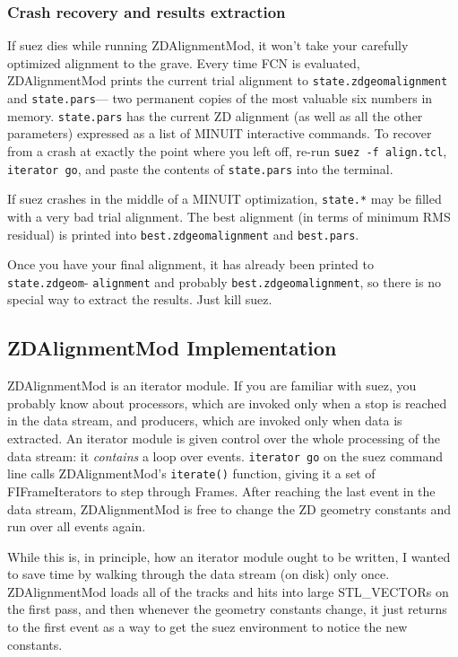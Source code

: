 \documentclass[12pt]{article}
\begin{document}
\subsubsection{Crash recovery and results extraction}

If suez dies while running ZDAlignmentMod, it won't take your
carefully optimized alignment to the grave.  Every time FCN is
evaluated, ZDAlignmentMod prints the current trial alignment to
{\tt state.zdgeomalignment} and {\tt state.pars}--- two permanent
copies of the most valuable six numbers in memory.  {\tt state.pars}
has the current ZD alignment (as well as all the other parameters)
expressed as a list of MINUIT interactive commands.  To recover from a
crash at exactly the point where you left off, re-run {\tt suez -f
align.tcl}, {\tt iterator go}, and paste the contents of
{\tt state.pars} into the terminal.

If suez crashes in the middle of a MINUIT optimization, {\tt state.*}
may be filled with a very bad trial alignment.  The best alignment (in
terms of minimum RMS residual) is printed into
{\tt best.zdgeomalignment} and {\tt best.pars}.

Once you have your final alignment, it has already been printed to
{\tt state.zdgeom}- {\tt alignment} and probably {\tt best.zdgeomalignment},
so there is no special way to extract the results.  Just kill suez.

\subsection{ZDAlignmentMod Implementation}

ZDAlignmentMod is an iterator module.  If you are familiar with suez,
you probably know about processors, which are invoked only when a stop
is reached in the data stream, and producers, which are invoked only
when data is extracted.  An iterator module is given control over the
whole processing of the data stream: it {\it contains} a loop over
events.  {\tt iterator go} on the suez command line calls
ZDAlignmentMod's {\tt iterate()} function, giving it a set of
FIFrameIterators to step through Frames.  After reaching the last
event in the data stream, ZDAlignmentMod is free to change the ZD
geometry constants and run over all events again.

While this is, in principle, how an iterator module ought to be
written, I wanted to save time by walking through the data stream (on
disk) only once.  ZDAlignmentMod loads all of the tracks and hits into
large STL\_VECTORs on the first pass, and then whenever the geometry
constants change, it just returns to the first event as a way to get
the suez environment to notice the new constants.
\end{document}
